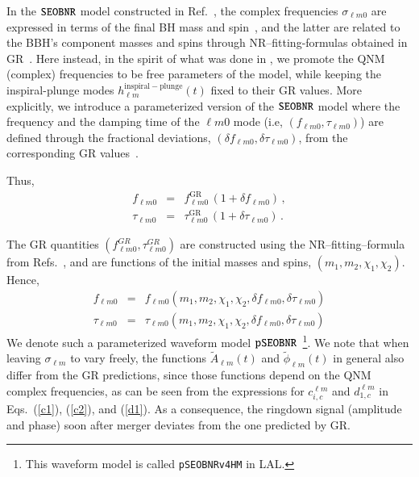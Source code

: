 In the $\texttt{SEOBNR}$ model constructed in Ref.~\cite{Cotesta:2018fcv}, the
complex frequencies $\sigma_{\ell m 0}$ are expressed in terms of the
final BH mass and spin~\cite{Berti:2005ys,Berti:2009kk}, and the
latter are related to the BBH's component masses and spins through
NR--fitting-formulas obtained in
GR~\cite{Taracchini:2013rva,Hofmann:2016yih}. Here instead, in the
spirit of what was done in \paperone, we promote the QNM (complex)
frequencies to be free parameters of the model, while keeping the
inspiral-plunge modes $h_{\ell m}^\mathrm{inspiral-plunge}(t)$ fixed
to their GR values. More explicitly, we introduce a parameterized
version of the $\texttt{SEOBNR}$ model where the frequency and the
damping time of the ${\ell m 0}$ mode (i.e, $(f_{\ell m 0}, \tau
_{\ell m 0})$) are defined through the fractional deviations, $(\delta
f_{\ell m 0},\delta \tau_{\ell m 0})$, from the corresponding GR
values~\cite{Gossan:2011ha,Meidam:2014jpa}.


Thus,
\begin{subequations}
\begin{eqnarray}
f_{\ell m 0} &=& f_{\ell m 0}^{\text{GR}}\, (1 + \delta f_{\ell m 0})\,,\label{eq:nongr_freqs_a} \\ 
\tau _{\ell m 0} &=& \tau _{\ell m 0}^{\text{GR}}\, (1 + \delta \tau_{\ell m 0})\,. \label{eq:nongr_freqs_b}
\end{eqnarray}
\end{subequations}

The GR quantities $( f_{\ell m 0}^{GR},\tau_{\ell m 0}^{GR})$ are
constructed using the NR--fitting--formula from Refs.~\cite{Taracchini:2013rva,Hofmann:2016yih}, and are functions of the initial masses and spins, $(m_1, m_2, \chi_1, \chi_2)$. Hence,
\begin{subequations}
\begin{eqnarray}
f_{\ell m 0} &=& f_{\ell m 0}(m_1, m_2, \chi_1, \chi_2, \delta f_{\ell m 0}, \delta \tau_{\ell m 0})\\ 
\tau _{\ell m 0} &=& \tau _{\ell m 0}(m_1, m_2, \chi_1, \chi_2, \delta f_{\ell m 0}, \delta \tau_{\ell m 0})
\end{eqnarray}
\end{subequations}
We denote such a parameterized waveform model $\texttt{pSEOBNR}$~\footnote{This
waveform model is called {\tt pSEOBNRv4HM} in LAL.}. We note that when leaving $\sigma_{\ell m}$ to vary
freely, the functions $\tilde{A}_{\ell m}(t)$ and $\tilde{\phi}_{\ell
  m}(t)$ in general also differ from the GR predictions, since
those functions depend on the QNM complex frequencies, as can be seen
from the expressions for $c_{i,c}^{\ell m}$ and $d_{1,c}^{\ell m}$ in Eqs.~(\ref{c1}),
(\ref{c2}), and (\ref{d1}). As a consequence, the ringdown signal (amplitude and phase) 
soon after merger deviates from the one predicted by GR.


